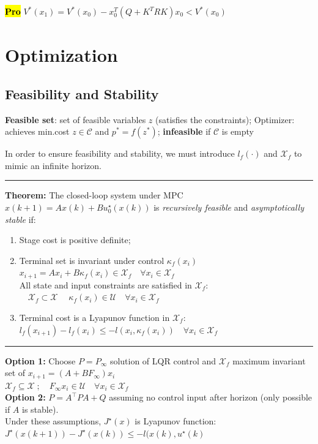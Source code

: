 \documentclass[10pt,a4paper,landscape]{article}
\newcommand{\hlc}[2][yellow]{ {\sethlcolor{#1} \hl{#2}} }
\newcommand{\quadRule}{\vspace{-3pt}\rule{0.23\textwidth}{0.4pt}}
\newcommand{\prove}{\footnotesize{\hlc[pink]{\textbf{Pro}}}} %
\begin{document}
\begin{multicols*}{4}
\prove $V^*(x_1)=V^*(x_0) - x_0^T (Q + K^TRK)x_0 < V^*(x_0)$


\section{Optimization}
\subsection{Feasibility and Stability}
\textbf{Feasible set}: set of feasible variables $z$ (satisfies the constraints); Optimizer: achieves min.cost $z \in \mathcal{C}$ and $p^* = f(z^*)$; \textbf{infeasible} if $\mathcal{C}$ is empty

In  order to ensure feasibility and stability, we must introduce $l_f(\cdot)$ and $\mathcal{X}_f$ to mimic an infinite horizon.

\quadRule

\textbf{Theorem:} The closed-loop system under MPC $x(k+1) = Ax(k) + Bu_0^\star(x(k))$ is \emph{recursively feasible} and \emph{asymptotically stable} if:
\begin{enumerate}
	\item Stage cost is positive definite;
	\item Terminal set is invariant under control $\kappa_f(x_i)$\\
	$x_{i+1} = Ax_i + B\kappa_f(x_i) \in \mathcal{X}_f \quad \forall x_i \in \mathcal{X}_f$\\
	All state and input constraints are satisfied in $\mathcal{X}_f$: $\quad \mathcal{X}_f \subset \mathcal{X} \quad \;\kappa_f(x_i) \in \mathcal{U} \quad \forall x_i \in \mathcal{X}_f$\\
	\item Terminal cost is a Lyapunov function in $\mathcal{X}_f$: $l_f(x_{i+1}) - l_f(x_i) \leq -l(x_i, \kappa_f(x_i)) \quad \forall x_i \in \mathcal{X}_f$
\end{enumerate}

\quadRule

\textbf{Option 1:} Choose $P=P_\infty$ solution of LQR control and $\mathcal{X}_f$ maximum invariant set of $x_{i+1} = (A + BF_\infty) x_i$\\
$\mathcal{X}_f \subseteq \mathcal{X} \; ; \quad F_\infty x_i \in \mathcal{U} \quad \forall x_i \in \mathcal{X}_f$\\
\textbf{Option 2:} $P = A^\top P A + Q$ assuming no control input after horizon (only possible if $A$ is stable).\\
Under these assumptions, $J^\star(x)$ is Lyapunov function:
$J^\star (x(k+1)) - J^\star (x(k)) \leq -l(x(k),u^\star(k)$


\end{multicols*}
\end{document}
